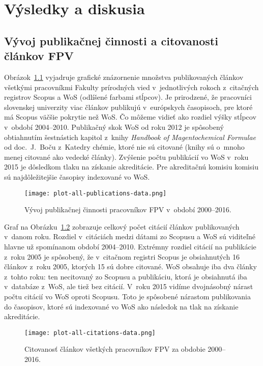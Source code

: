 \chapter{Výsledky a diskusia}
\label{chap:results}

\section{Vývoj publikačnej činnosti a citovanosti článkov FPV}

Obrázok~\ref{fig:all.publications.plot} vyjadruje grafické znázornenie množstva
publikovaných článkov všetkými pracovníkmi Fakulty prírodných vied
v~jednotlivých rokoch z~citačných registrov Scopus a WoS (odlíšené farbami
stĺpcov).  Je prirodzené, že pracovníci slovenskej univerzity viac článkov
publikujú v~európskych časopisoch, pre ktoré má Scopus väčšie pokrytie než WoS.
Čo môžeme vidieť ako rozdiel výšky stĺpcov v~období 2004--2010.  Publikačný skok
WoS od roku 2012 je spôsobený obtiahnutím šestnástich kapitol z~knihy
\emph{Handbook of Magentochemical Formulae} od doc.~J.~Boču z~Katedry chémie,
ktoré nie sú citované (knihy sú o~mnoho menej citované ako vedecké články).
Zvýšenie počtu publikácií vo WoS v~roku 2015 je dôsledkom tlaku na získanie
akreditácie.  Pre akreditačnú komisiu komisiu sú najdôležitejšie časopisy
indexované vo WoS.

\begin{figure}
  \centering
  \texttt{[image: plot-all-publications-data.png]}
  \caption[Vývoj publikačnej činnosti pracovníkov FPV v~období 2000--2016]%
  {Vývoj publikačnej činnosti pracovníkov FPV v~období 2000--2016.}
  \label{fig:all.publications.plot}
\end{figure}

Graf na Obrázku~\ref{fig:all.citations.plot} zobrazuje celkový počet citácií
článkov publikovaných v~danom roku.  Rozdiel v~citáciách medzi dátami zo Scopusu
a WoS sú viditeľné hlavne už spomínanom období 2004--2010.  Extrémny rozdiel
citácií na publikácie z~roku 2005 je spôsobený, že v~citačnom registri Scopus je
obsiahnutých 16 článkov z~roku 2005, ktorých 15 sú dobre citované.  WoS obsahuje
iba dva články z~tohto roku: ten necitovaný zo Scopusu a publikáciu, ktorá je
obsiahnutá iba v~databáze z~WoS, ale tiež bez citácií.  V~roku 2015 vidíme
dvojnásobný nárast počtu citácií vo WoS oproti Scopusu.  Toto je spôsobené
nárastom publikovania do časopisov, ktoré sú indexované vo WoS ako následok na
tlak na získanie akreditácie.

\begin{figure}
  \centering
  \texttt{[image: plot-all-citations-data.png]}
  \caption[Citovanosť článkov všetkých pracovníkov FPV za obdobie 2000--2016]%
  {Citovanosť článkov všetkých pracovníkov FPV za obdobie 2000--2016.}
  \label{fig:all.citations.plot}
\end{figure}


